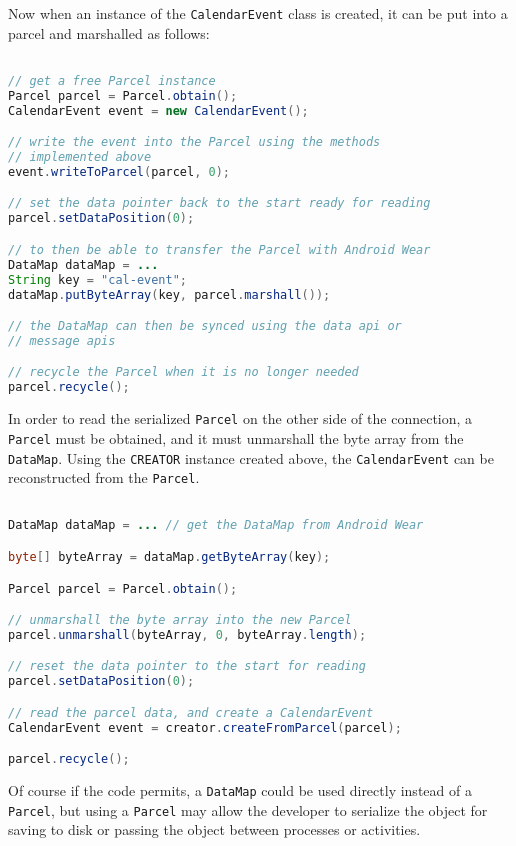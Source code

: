Now when an instance of the \texttt{CalendarEvent} class is created, it can
be put into a parcel and marshalled as follows:

\begin{lstlisting}[language=Java]

// get a free Parcel instance
Parcel parcel = Parcel.obtain();
CalendarEvent event = new CalendarEvent();

// write the event into the Parcel using the methods
// implemented above
event.writeToParcel(parcel, 0);

// set the data pointer back to the start ready for reading
parcel.setDataPosition(0);

// to then be able to transfer the Parcel with Android Wear
DataMap dataMap = ...
String key = "cal-event";
dataMap.putByteArray(key, parcel.marshall());

// the DataMap can then be synced using the data api or
// message apis

// recycle the Parcel when it is no longer needed
parcel.recycle();

\end{lstlisting}

In order to read the serialized \texttt{Parcel} on the other side of the
connection, a \texttt{Parcel} must be obtained, and it must unmarshall the byte
array from the \texttt{DataMap}. Using the \texttt{CREATOR} instance created
above, the \texttt{CalendarEvent} can be reconstructed from the \texttt{Parcel}.

\begin{lstlisting}[language=Java]

DataMap dataMap = ... // get the DataMap from Android Wear

byte[] byteArray = dataMap.getByteArray(key);

Parcel parcel = Parcel.obtain();

// unmarshall the byte array into the new Parcel
parcel.unmarshall(byteArray, 0, byteArray.length);

// reset the data pointer to the start for reading
parcel.setDataPosition(0);

// read the parcel data, and create a CalendarEvent
CalendarEvent event = creator.createFromParcel(parcel);

parcel.recycle();

\end{lstlisting}

Of course if the code permits, a \texttt{DataMap} could be used directly instead
of a \texttt{Parcel}, but using a \texttt{Parcel} may allow the developer to
serialize the object for saving to disk or passing the object between processes
or activities.


